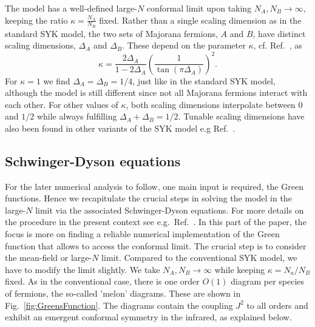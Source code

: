 The model has a well-defined large-$N$ conformal limit upon taking $N_A,N_B\to\infty$, keeping the ratio $\kappa = \frac{N_A}{N_B}$ fixed.
Rather than a single scaling dimension as in the standard SYK model, the two sets of Majorana fermions,
$A$ and $B$, have distinct scaling dimensions, $\Delta_A$ and $\Delta_B$.
These depend on the parameter $\kappa$, cf. Ref.~\cite{Fremling_2022}, as
%
\begin{equation} \label{eq_scalin_dims}
	\kappa = \frac{2 \Delta_A}{1-2\Delta_A}\left( \frac{1}{\tan \left( \pi \Delta_A\right)}\right)^2.
\end{equation}
%
For $\kappa=1$ we find $\Delta_A=\Delta_B=1/4$, just like in the standard SYK model,
although the model is still different since not all Majorana fermions interact with each other.
For other values of $\kappa$, both scaling dimensions interpolate between $0$ and $1/2$ while always fulfilling $\Delta_A+\Delta_B=1/2$.
Tunable scaling dimensions have also been found in other variants of the SYK model e.g Ref.~\cite{Marcus2019,Kim2019,garcia-garcia_sparse_2021,xu_sparse_2020}.




\subsection{Schwinger-Dyson equations}
\label{sec_greens}
%
For the later numerical analysis to follow, one main input is required, the Green functions.
Hence we recapitulate the crucial steps in solving the model in the large-$N$ limit via the associated Schwinger-Dyson equations.
For more details on the procedure in the present context see e.g.~Ref.~\cite{Fremling_2022}. In this part of the paper,
the focus is more on finding a reliable numerical implementation of the Green function that allows to access the conformal limit. 
The crucial step is to consider the mean-field or large-$N$ limit.
Compared to the conventional SYK model, we have to modify the limit slightly.
We take $N_A,N_B\to\infty$ while keeping $\kappa=N_a/N_B$ fixed. As in the conventional case,
there is one order $O(1)$ diagram per species of fermions, the so-called 'melon' diagrams.
These are shown in Fig.~\ref{fig:GreensFunction}.
The diagrams contain the coupling $J^2$ to all orders and exhibit an emergent conformal symmetry in the infrared, as explained below.

